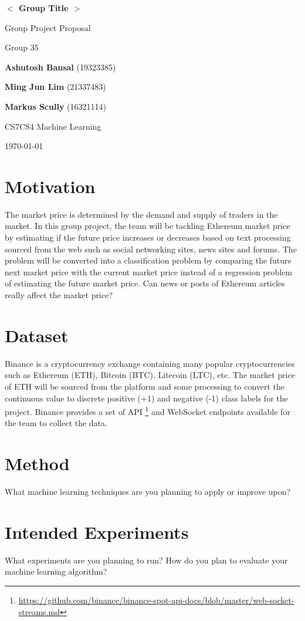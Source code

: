 \documentclass{article}
\begin{document}
\begin{titlepage}
	\begin{center}
		\vspace*{3cm}

		\textbf{ $<$ Group Title $>$ }
       
		\vspace{0.5cm}
		Group Project Proposal
		
		Group 35   
                      

		\vfill
            
		\textbf{Ashutosh Bansal} (19323385)
       
		\textbf{Ming Jun Lim} (21337483)
		
		\textbf{Markus Scully} (16321114)		
       

		\vspace{0.5cm}
		CS7CS4 Machine Learning     
       
			 
		\today           
       
		\vspace{1.5cm}                            
	\end{center}
\end{titlepage}


\section{Motivation}

The market price is determined by the demand and supply of traders in the market. In this group project, the team will be tackling Ethereum market price by estimating if the future price increases or decreases based on text processing sourced from the web such as social networking sites, news sites and forums. The problem will be converted into a classification problem by comparing the future next market price with the current market price instead of a regression problem of estimating the future market price. Can news or posts of Ethereum articles really affect the market price?

\section{Dataset}

Binance is a cryptocurrency exchange containing many popular cryptocurrencies such as Ethereum (ETH), Bitcoin (BTC), Litecoin (LTC), etc. The market price of ETH will be sourced from the platform and some processing to convert the continuous value to discrete positive (+1) and negative (-1) class labels for the project. Binance provides a set of API \footnote{\url{https://github.com/binance/binance-spot-api-docs/blob/master/web-socket-streams.md}} and WebSocket endpoints available for the team to collect the data. 



\section{Method}

What machine learning techniques are you planning to apply or improve upon?

\section{Intended Experiments}

What experiments are you planning to run? How do you plan to evaluate your machine learning algorithm?
\end{document}
